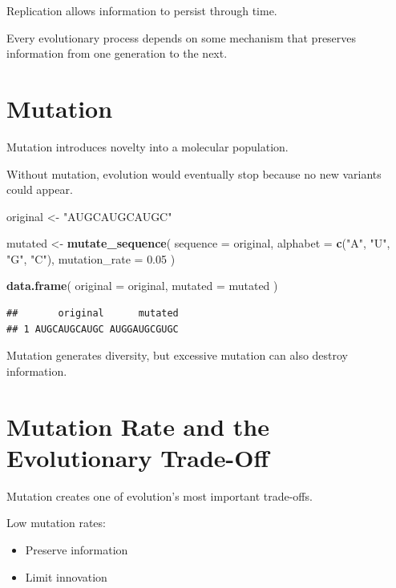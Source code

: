 \documentclass[
  oneside,
  openany]{book}
\newenvironment{Shaded}{\begin{snugshade}}{\end{snugshade}}
\newcommand{\AttributeTok}[1]{\textcolor[rgb]{0.13,0.29,0.53}{#1}}
\newcommand{\FloatTok}[1]{\textcolor[rgb]{0.00,0.00,0.81}{#1}}
\newcommand{\FunctionTok}[1]{\textcolor[rgb]{0.13,0.29,0.53}{\textbf{#1}}}
\newcommand{\NormalTok}[1]{#1}
\newcommand{\OtherTok}[1]{\textcolor[rgb]{0.56,0.35,0.01}{#1}}
\newcommand{\StringTok}[1]{\textcolor[rgb]{0.31,0.60,0.02}{#1}}
\providecommand{\tightlist}{%
  \setlength{\itemsep}{0pt}\setlength{\parskip}{0pt}}
\begin{document}
Replication allows information to persist through time.

Every evolutionary process depends on some mechanism that preserves information from one generation to the next.

\section{Mutation}\label{mutation}

Mutation introduces novelty into a molecular population.

Without mutation, evolution would eventually stop because no new variants could appear.

\begin{Shaded}
\begin{Highlighting}[]
\NormalTok{original }\OtherTok{\textless{}{-}} \StringTok{"AUGCAUGCAUGC"}

\NormalTok{mutated }\OtherTok{\textless{}{-}} \FunctionTok{mutate\_sequence}\NormalTok{(}
  \AttributeTok{sequence =}\NormalTok{ original,}
  \AttributeTok{alphabet =} \FunctionTok{c}\NormalTok{(}\StringTok{"A"}\NormalTok{, }\StringTok{"U"}\NormalTok{, }\StringTok{"G"}\NormalTok{, }\StringTok{"C"}\NormalTok{),}
  \AttributeTok{mutation\_rate =} \FloatTok{0.05}
\NormalTok{)}

\FunctionTok{data.frame}\NormalTok{(}
  \AttributeTok{original =}\NormalTok{ original,}
  \AttributeTok{mutated =}\NormalTok{ mutated}
\NormalTok{)}
\end{Highlighting}
\end{Shaded}

\begin{verbatim}
##       original      mutated
## 1 AUGCAUGCAUGC AUGGAUGCGUGC
\end{verbatim}

Mutation generates diversity, but excessive mutation can also destroy information.

\section{Mutation Rate and the Evolutionary Trade-Off}\label{mutation-rate-and-the-evolutionary-trade-off}

Mutation creates one of evolution's most important trade-offs.

Low mutation rates:

\begin{itemize}
\tightlist
\item
  Preserve information
\item
  Limit innovation
\end{itemize}
\end{document}
